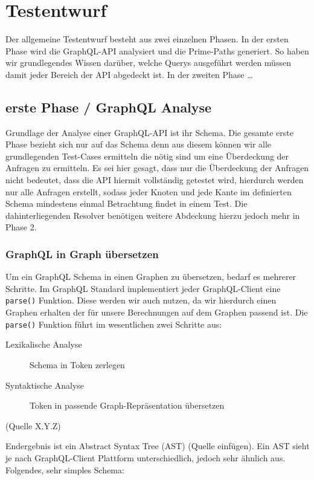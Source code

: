 \chapter{Testentwurf}

Der allgemeine Testentwurf besteht aus zwei einzelnen Phasen.
In der ersten Phase wird die GraphQL-API analysiert und die Prime-Paths generiert.
So haben wir grundlegendes Wissen darüber, welche Querys ausgeführt werden müssen damit jeder Bereich
der API abgedeckt ist.
In der zweiten Phase \ldots

\section{erste Phase / GraphQL Analyse}

Grundlage der Analyse einer GraphQL-API ist ihr Schema.
Die gesamte erste Phase bezieht sich nur auf das Schema denn aus diesem können wir alle grundlegenden
Test-Cases ermitteln die nötig sind um eine Überdeckung der Anfragen zu ermitteln.
Es sei hier gesagt, dass nur die Überdeckung der Anfragen nicht bedeutet, dass die API hiermit vollständig getestet wird,
hierdurch werden nur alle Anfragen erstellt, sodass jeder Knoten und jede Kante im definierten Schema mindestens
einmal Betrachtung findet in einem Test.
Die dahinterliegenden Resolver benötigen weitere Abdeckung hierzu jedoch mehr in Phase 2.

\subsection{GraphQL in Graph übersetzen}

Um ein GraphQL Schema in einen Graphen zu übersetzen, bedarf es mehrerer Schritte.
Im GraphQL Standard implementiert jeder GraphQL-Client eine {\tt parse()} Funktion.
Diese werden wir auch nutzen, da wir hierdurch einen Graphen erhalten der für unsere Berechnungen auf dem
Graphen passend ist.
Die {\tt parse()} Funktion führt im wesentlichen zwei Schritte aus:

\begin{description}
    \item[Lexikalische Analyse] Schema in Token zerlegen
    \item[Syntaktische Analyse] Token in passende Graph-Repräsentation übersetzen
\end{description} (Quelle X.Y.Z)

Endergebnis ist ein Abstract Syntax Tree (AST) (Quelle einfügen).
Ein AST sieht je nach GraphQL-Client Plattform unterschiedlich, jedoch sehr ähnlich aus.
Folgendes, sehr simples Schema:

